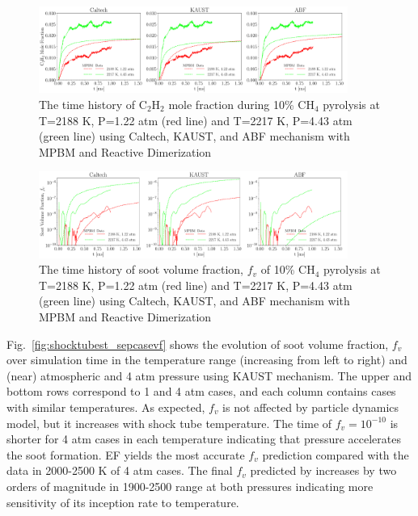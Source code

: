 \begin{figure}[H]
	\centering
	\includegraphics[width=0.9\textwidth]{Figures/Results/Shocktube/Stanford/September/stsh_sepmechs_C2H2.pdf}
	\caption{The time history of $\mathrm{C_2H_2}$ mole fraction during 10\% $\mathrm{CH_4}$ pyrolysis at T=2188 K, P=1.22 atm (red line) and T=2217 K, P=4.43 atm (green line) using Caltech, KAUST, and ABF mechanism with MPBM and Reactive Dimerization}
	\label{fig:shocktubes_sepc2h2} 
\end{figure}

\begin{figure}[H]
	\centering
	\includegraphics[width=0.9\textwidth]{Figures/Results/Shocktube/Stanford/September/stsh_sepmechs_vf.pdf}
	\caption{The time history of soot volume fraction, $f_v$ of 10\% $\mathrm{CH_4}$ pyrolysis at T=2188 K, P=1.22 atm (red line) and T=2217 K, P=4.43 atm (green line) using Caltech, KAUST, and ABF mechanism with MPBM and Reactive Dimerization}
	\label{fig:shocktubes_sepvf} 
\end{figure}

Fig.~\ref{fig:shocktubest_sepcasevf} shows the evolution of soot volume fraction, $f_v$ over simulation time in the temperature range (increasing from left to right) and (near) atmospheric and 4 atm pressure using KAUST mechanism. The upper and bottom rows correspond to 1 and 4 atm cases, and each column contains cases with similar temperatures. As expected, $f_v$ is not affected by particle dynamics model, but it increases with shock tube temperature. The time of $f_v=10^{-10}$ is shorter for 4 atm cases in each temperature indicating that pressure accelerates the soot formation. EF yields the most accurate $f_v$ prediction compared with the data in 2000-2500 K of 4 atm cases. The final $f_v$ predicted by increases by two orders of magnitude in 1900-2500 range at both pressures indicating more sensitivity of its inception rate to temperature.


